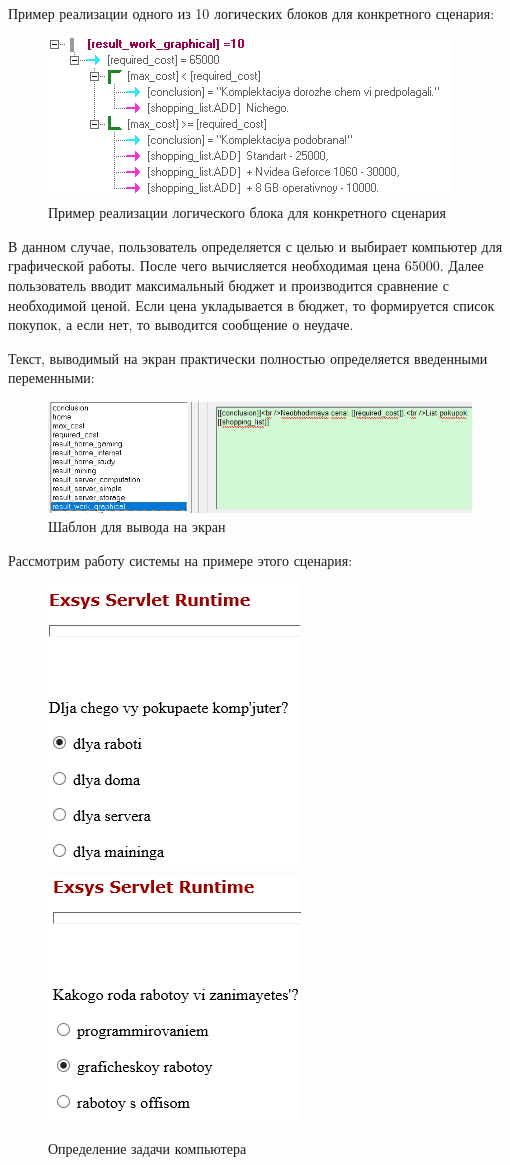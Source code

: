 \documentclass[14pt,a4paper,report]{report}
\begin{document}
Пример реализации одного из 10 логических блоков для конкретного сценария:

\begin{figure}[h!]
	\centering
	\includegraphics[scale = 0.95]{images/2.png}
	\caption{Пример реализации логического блока для конкретного сценария}
\end{figure}

В данном случае, пользователь определяется с целью и выбирает компьютер для графической работы. После чего вычисляется необходимая цена 65000. Далее пользователь вводит максимальный бюджет и производится сравнение с необходимой ценой. Если цена укладывается в бюджет, то формируется список покупок, а если нет, то выводится сообщение о неудаче.

Текст, выводимый на экран практически полностью определяется введенными переменными:

\begin{figure}[h!]
	\centering
	\includegraphics[scale = 0.85]{images/3.png}
	\caption{Шаблон для вывода на экран}
\end{figure}

Рассмотрим работу системы на примере этого сценария:

\begin{figure}[ht!]
	\includegraphics[width=.30\textwidth]{images/4.png}\hfill
	\includegraphics[width=.35\textwidth]{images/5.png}
	\caption{Определение задачи компьютера}
\end{figure}
\end{document}
